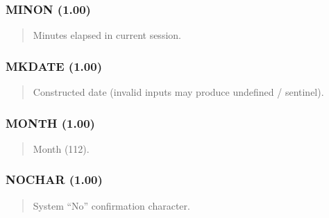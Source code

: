 \documentclass[letterpaper,10pt,english]{sphinxmanual}
\begin{document}
\subsubsection{MINON (1.00)}
\label{\detokenize{ppl:minon-1-00}}\begin{quote}

\sphinxAtStartPar
{}
\begin{description}
\sphinxAtStartPar
Minutes elapsed in current session.

\end{description}
\end{quote}


\subsubsection{MKDATE (1.00)}
\label{\detokenize{ppl:mkdate-1-00}}\begin{quote}

\sphinxAtStartPar
{}
\begin{description}
\sphinxAtStartPar
Constructed date (invalid inputs may produce undefined / sentinel).

\end{description}
\end{quote}


\subsubsection{MONTH (1.00)}
\label{\detokenize{ppl:month-1-00}}\begin{quote}

\sphinxAtStartPar
{}
\begin{description}
\sphinxAtStartPar
Month (1\textendash{}12).

\end{description}
\end{quote}


\subsubsection{NOCHAR (1.00)}
\label{\detokenize{ppl:nochar-1-00}}\begin{quote}

\sphinxAtStartPar
{}
\begin{description}
\sphinxAtStartPar
System “No” confirmation character.

\end{description}
\end{quote}
\end{document}
